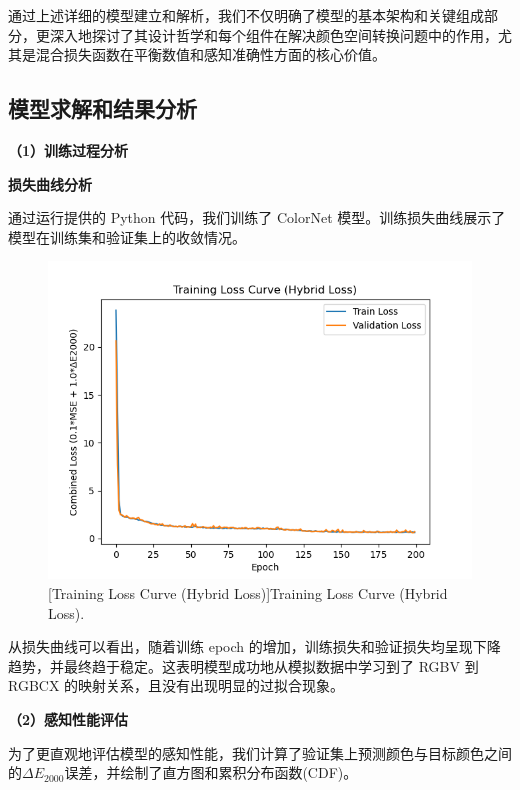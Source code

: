 通过上述详细的模型建立和解析，我们不仅明确了模型的基本架构和关键组成部分，更深入地探讨了其设计哲学和每个组件在解决颜色空间转换问题中的作用，尤其是混合损失函数在平衡数值和感知准确性方面的核心价值。

\subsection[\hspace{-2pt}模型求解和结果分析]{{\heiti{} \hspace{-8pt}模型求解和结果分析}}\label{section2: 模型求解和结果分析}

\noindent\textbf{（1）训练过程分析}

 \textbf{损失曲线分析}

通过运行提供的 Python 代码，我们训练了 ColorNet 模型。训练损失曲线展示了模型在训练集和验证集上的收敛情况。

\begin{figure}[H]
\centering
{}
\includegraphics[width=0.8\columnwidth]{figures/Training_Loss_Curve.png}
[Training Loss Curve (Hybrid Loss)]{Training Loss Curve (Hybrid Loss).}
\label{figure2: loss_curve}
\end{figure}

从损失曲线可以看出，随着训练 epoch 的增加，训练损失和验证损失均呈现下降趋势，并最终趋于稳定。这表明模型成功地从模拟数据中学习到了 RGBV 到 RGBCX 的映射关系，且没有出现明显的过拟合现象。

\noindent\textbf{（2）感知性能评估}

为了更直观地评估模型的感知性能，我们计算了验证集上预测颜色与目标颜色之间的$\Delta E_{2000}$误差，并绘制了直方图和累积分布函数(CDF)。

